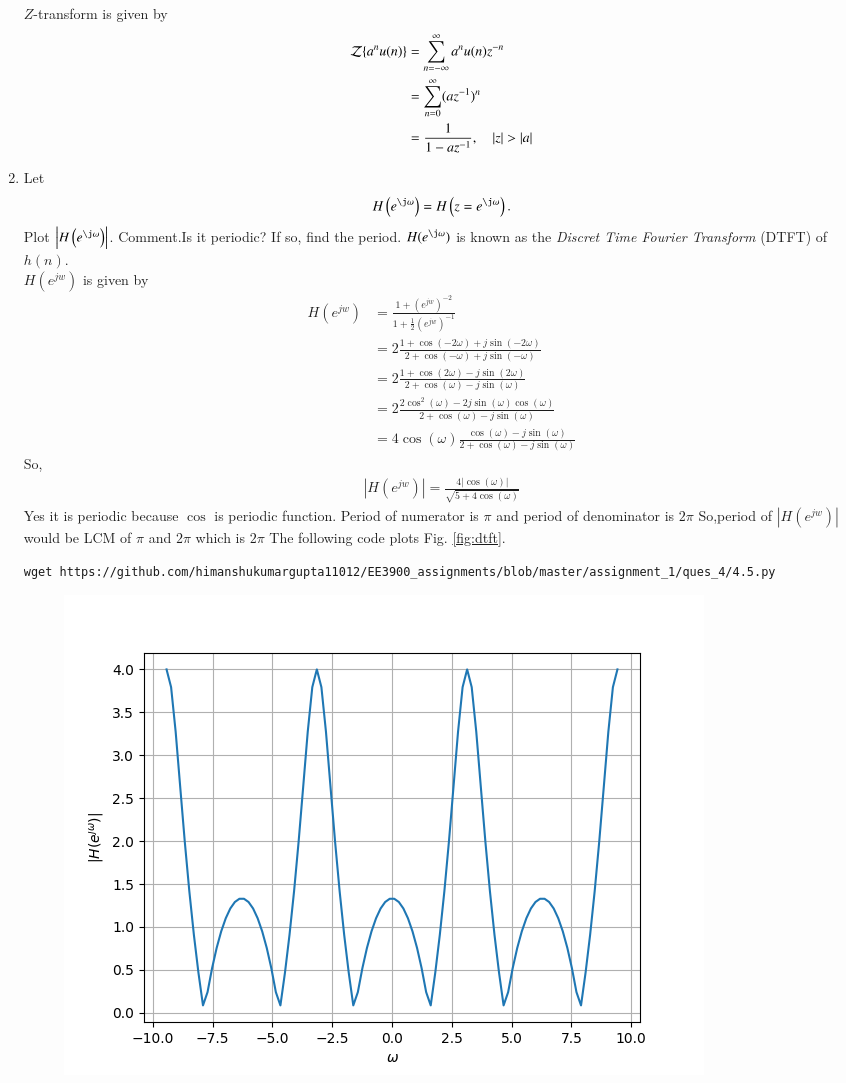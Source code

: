\documentclass[journal,12pt,twocolumn]{IEEEtran}
\renewcommand\thesection{\arabic{section}}
\begin{document}
\begin{enumerate}[label=\thesection.\arabic*]
\solution $Z$-transform is given by
\begin{align}
	\mathcal{Z}\{a^nu(n)\}&=\sum_{n=-\infty}^\infty a^nu(n)z^{-n}\\
	&=\sum_{n=0}^\infty (az^{-1})^{n}\\
	&=\frac{1}{1-az^{-1}},\quad \left\vert z\right\vert > \left\vert a\right\vert
\end{align}
\item 
Let
\begin{equation}
H\brak{e^{\j \omega}} = H\brak{z = e^{\j \omega}}.
\end{equation}
Plot $\abs{H\brak{e^{\j \omega}}}$.  Comment.Is it periodic? If so, find the
period.  $H(e^{\j \omega})$ is
known as the {\em Discret Time Fourier Transform} (DTFT) of $h(n)$.
\\
\solution $H(e^{jw})$ is given by
\begin{align}
	H(e^{jw})&=\frac{1+(e^{jw})^{-2}}{1+\frac{1}{2}(e^{jw})^{-1}}\\
	&=2\frac{1+\cos(-2\omega)+j\sin(-2\omega)}{2+\cos(-\omega)+j\sin(-\omega)}\\
	&=2\frac{1+\cos(2\omega)-j\sin(2\omega)}{2+\cos(\omega)-j\sin(\omega)}\\
	&=2\frac{2\cos^2(\omega)-2j\sin(\omega)\cos(\omega)}{2+\cos(\omega)-j\sin(\omega)}\\
	&=4\cos(\omega)\frac{\cos(\omega)-j\sin(\omega)}{2+\cos(\omega)-j\sin(\omega)}
\end{align}
So,
\begin{align}
	|H(e^{jw})|=\frac{4|\cos(\omega)|}{\sqrt{5+4\cos(\omega)}}
\end{align}
Yes it is periodic because $\cos$ is periodic function.
Period of numerator is $\pi$ and period of denominator is $2\pi$
So,period of $|H(e^{jw})|$ would be LCM of $\pi$ and $2\pi$ which is $2\pi$
The following code plots Fig. \ref{fig:dtft}.
\begin{lstlisting}
wget https://github.com/himanshukumargupta11012/EE3900_assignments/blob/master/assignment_1/ques_4/4.5.py
\end{lstlisting}
\begin{figure}[!ht]
\centering
\includegraphics[width=\columnwidth]{./ques_4/H_w}

\end{figure}
\end{enumerate}
\end{document}
